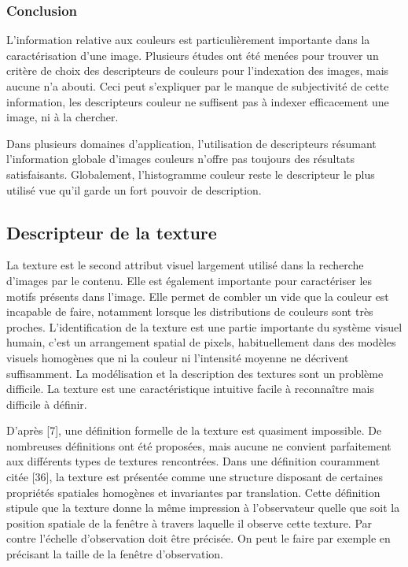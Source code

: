 \subsubsection{Conclusion}
L'information relative aux couleurs est particulièrement importante dans la caractérisation d’une image. Plusieurs études ont été menées pour trouver un critère de choix des descripteurs de couleurs pour l'indexation des images, mais aucune n'a abouti. Ceci peut s’expliquer par le manque de subjectivité de cette information, les descripteurs couleur ne suffisent pas à indexer efficacement une image, ni à la chercher.

Dans plusieurs domaines d’application, l’utilisation de descripteurs résumant l’information globale d’images couleurs n’offre pas toujours des résultats satisfaisants. Globalement, l’histogramme couleur reste le descripteur le plus utilisé vue qu'il garde un fort pouvoir de description.




\subsection{Descripteur de la texture}

La texture est le second attribut visuel largement utilisé dans la recherche d’images par le contenu. Elle est également importante pour caractériser les motifs présents dans l’image. Elle permet de combler un vide que la couleur est incapable de faire, notamment lorsque les distributions de couleurs sont très proches. L'identification de la texture est une partie importante du système visuel humain, c'est un arrangement spatial de pixels, habituellement dans des modèles visuels homogènes que ni la couleur ni l'intensité moyenne ne décrivent suffisamment. La modélisation et la description des textures sont un problème difficile. La texture est une caractéristique intuitive facile à reconnaître mais difficile à définir.

D'après [7], une définition formelle de la texture est quasiment impossible. De nombreuses définitions ont été proposées, mais aucune ne convient parfaitement aux différents types de textures rencontrées. Dans une définition couramment citée [36], la texture est présentée comme une structure disposant de certaines propriétés spatiales homogènes et invariantes par translation. Cette définition stipule que la texture donne la même impression à l'observateur quelle que soit la position spatiale de la fenêtre à travers laquelle il observe cette texture. Par contre l’échelle d’observation doit être précisée. On peut le faire par exemple en précisant la taille de la fenêtre d’observation.\\


